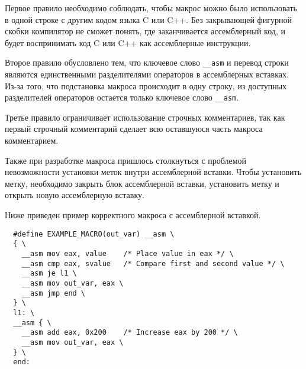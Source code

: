 Первое правило необходимо соблюдать, чтобы макрос можно было использовать в
одной строке с другим кодом языка C или C++. Без закрывающей фигурной скобки
компилятор не сможет понять, где заканчивается ассемблерный код, и будет
воспринимать код C или C++ как ассемблерные инструкции.

Второе правило обусловлено тем, что ключевое слово \verb!__asm! и перевод строки
являются единственными разделителями операторов в ассемблерных вставках. Из-за
того, что подстановка макроса происходит в одну строку, из доступных
разделителей операторов остается только ключевое слово \verb!__asm!.

Третье правило ограничивает использование строчных комментариев, так как первый
строчный комментарий сделает всю оставшуюся часть макроса комментарием.

Также при разработке макроса пришлось столкнуться с проблемой невозможности
установки меток внутри ассемблерной вставки. Чтобы установить метку,
необходимо закрыть блок ассемблерной вставки, установить метку и открыть новую
ассемблерную вставку.

Ниже приведен пример корректного макроса с ассемблерной вставкой.
\begin{verbatim}
  #define EXAMPLE_MACRO(out_var) __asm \
  { \
    __asm mov eax, value    /* Place value in eax */ \
    __asm cmp eax, svalue   /* Compare first and second value */ \
    __asm je l1 \
    __asm mov out_var, eax \ 
    __asm jmp end \
  } \
  l1: \
  __asm { \
    __asm add eax, 0x200    /* Increase eax by 200 */ \
    __asm mov out_var, eax \
  } \
  end:
\end{verbatim}
